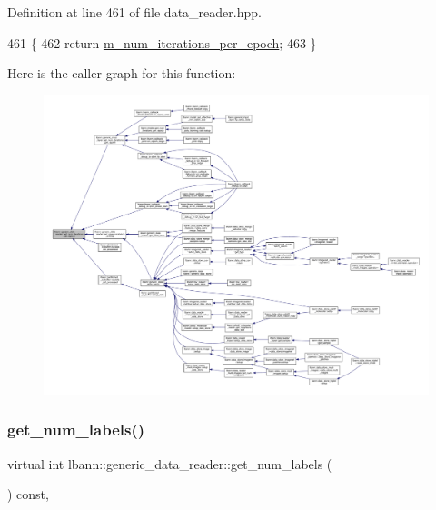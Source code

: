 Definition at line 461 of file data\+\_\+reader.\+hpp.


\begin{DoxyCode}
461                                            \{
462     \textcolor{keywordflow}{return} \hyperlink{classlbann_1_1generic__data__reader_ab570063483a1f604ca2fc536c3d83de7}{m\_num\_iterations\_per\_epoch};  
463   \}
\end{DoxyCode}
Here is the caller graph for this function\+:\nopagebreak
\begin{figure}[H]
\begin{center}
\leavevmode
\includegraphics[width=350pt]{classlbann_1_1generic__data__reader_a06fb58d1c0b84b8c76f5b4d160751f34_icgraph}
\end{center}
\end{figure}
\mbox{\label{classlbann_1_1generic__data__reader_a935ce6262d75f1834e550c3bc16a6547}} 
\subsubsection{\texorpdfstring{get\+\_\+num\+\_\+labels()}{get\_num\_labels()}}
{\footnotesize\ttfamily virtual int lbann\+::generic\+\_\+data\+\_\+reader\+::get\+\_\+num\+\_\+labels (\begin{DoxyParamCaption}{ }\end{DoxyParamCaption}) const\hspace{0.3cm}{\ttfamily [inline]}, {\ttfamily [virtual]}}




